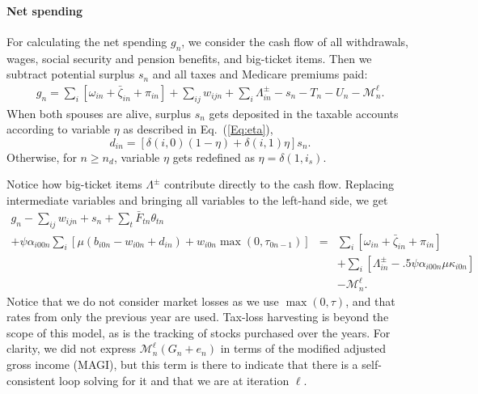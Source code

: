 \documentclass{report}[fleqn,12pt]
\begin{document}
\paragraph*{Net spending}
	For calculating the net spending $g_n$, we consider the cash flow of all withdrawals,
	wages, social security and pension benefits, and big-ticket items. 
	Then we subtract potential surplus $s_{n}$ and all taxes and Medicare premiums paid:
	\begin{eqnarray}
		g_n = \sum_i [\omega_{in} + \bar{\zeta}_{in} + \pi_{in} ] 
		+ \sum_{ij} w_{ijn} + \sum_i \Lambda^\pm_{in} - s_{n}
		- T_n - U_n - \mathcal{M}^\ell_n.
	\end{eqnarray}
	When both spouses are alive, surplus $s_n$ gets deposited in the taxable accounts
	according to variable $\eta$ as described in Eq.~(\ref{Eq:eta}),
	\begin{equation}
		\label{Eq:eta2}
		d_{in} = [\delta(i, 0)(1 - \eta) + \delta(i, 1)\eta] s_n .
	\end{equation}
	Otherwise, for $n \ge n_d$, variable $\eta$ gets redefined as $\eta = \delta(1, i_s)$.

	Notice how big-ticket items $\Lambda^\pm$ contribute directly to the cash flow.
	Replacing intermediate variables and bringing all variables to the left-hand side, we get
	\begin{eqnarray}
		\label{Eq:C4}
		g_n - \sum_{ij} w_{ijn} + s_{n}
		+ \sum_t \bar{F}_{tn} \theta_{t n} &&\nonumber \\
		+ \psi\alpha_{i00n} \sum_{i} \left[\mu(b_{i0n} - w_{i0n} + d_{in})
		+ w_{i0n}\max(0, \tau_{0n-1})\right] 
		&=& \sum_i [\omega_{in} + \bar{\zeta}_{in} + \pi_{in} ] \nonumber\\
		&& + \sum_i [\Lambda^\pm_{in} - .5\psi\alpha_{i00n}\mu\kappa_{i0n}] \nonumber\\
		&& - \mathcal{M}_n^\ell.
	\end{eqnarray}
	Notice that we do not consider market losses as we use $\max(0, \tau)$, and that
	rates from only the previous year are used. Tax-loss
	harvesting is beyond the scope of this model, as is the tracking of stocks
	purchased over the years.
	For clarity, we did not express $\mathcal{M}_n^\ell(G_n+e_n)$ in terms of the modified
	adjusted gross income (MAGI), but this term is there to indicate that there is a self-consistent
	loop solving for it and that we are at iteration $\ell$.
\end{document}
